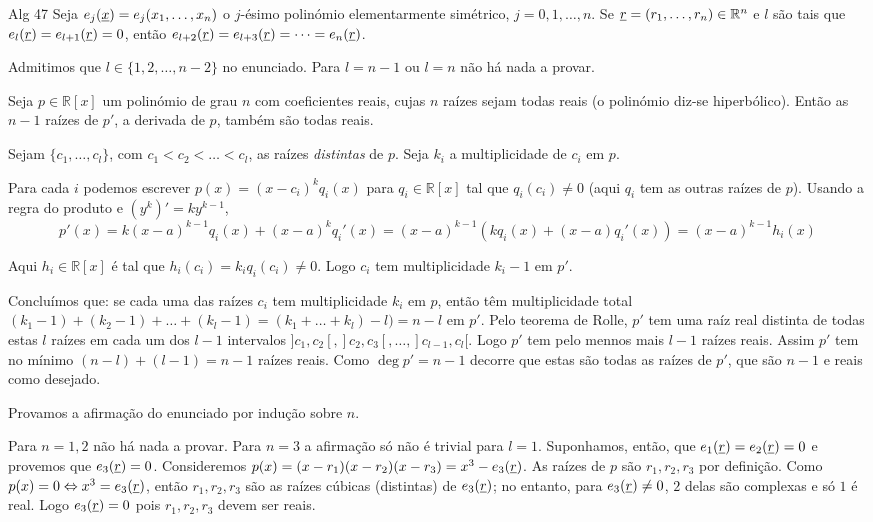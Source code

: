 \documentclass[main.tex]{subfiles}
\renewcommand*{\u}[1]{\ensuremath{\uline{#1}}}
\begin{document}
\begin{problem}{Alg 47}
Seja $e_j(\u{x})=e_j(x_1,\dots,x_n)$ o $j$-ésimo polinómio elementarmente
simétrico, $j=0,1,\dots,n$.
Se $\u{r}=(r_1,\dots,r_n)\in\mathbb{R}^n$ e $l$ são tais que
$e_l(\u{r})=e_{l+1}(\u{r})=0$, então
$e_{l+2}(\u{r})=e_{l+3}(\u{r})=\dots=e_n(\u{r})$.
\end{problem}

\begin{solution}
Admitimos que $l\in\{1,2,\dots,n-2\}$ no enunciado.
Para $l=n-1$ ou $l=n$ não há nada a provar.

\begin{lemma}
Seja $p\in\mathbb{R}[x]$ um polinómio de grau $n$ com coeficientes reais,
cujas $n$ raízes sejam todas reais (o polinómio diz-se hiperbólico).
Então as $n-1$ raízes de $p'$, a derivada de $p$, também são todas reais.

\begin{quickproof}
Sejam $\{c_1,\dots,c_l\}$, com $c_1<c_2<\dots<c_l$,
as raízes \emph{distintas} de $p$.
Seja $k_i$ a multiplicidade de $c_i$ em $p$.

Para cada $i$ podemos escrever $p(x)=(x-c_i)^k q_i(x)$
para $q_i\in\mathbb{R}[x]$ tal que $q_i(c_i)\neq 0$
(aqui $q_i$ tem as outras raízes de $p$).
Usando a regra do produto e $(y^k)'=ky^{k-1}$,
\begin{equation*}
p'(x)=k(x-a)^{k-1} q_i(x)+(x-a)^kq_i'(x)
=(x-a)^{k-1}(kq_i(x)+(x-a)q_i'(x))
=(x-a)^{k-1}h_i(x)
\end{equation*}

Aqui $h_i\in\mathbb{R}[x]$ é tal que $h_i(c_i)=k_iq_i(c_i)\neq 0$.
Logo $c_i$ tem multiplicidade $k_i-1$ em $p'$.

Concluímos que: se cada uma das raízes $c_i$ tem multiplicidade $k_i$ em $p$,
então têm multiplicidade total
$(k_1-1)+(k_2-1)+\dots+(k_l-1)=(k_1+\dots+k_l)-l)=n-l$ em $p'$.
Pelo teorema de Rolle, $p'$ tem uma raíz real distinta de todas estas $l$
raízes em cada um dos $l-1$ intervalos $]c_1,c_2[,]c_2,c_3[,\dots,]c_{l-1},c_l[$.
Logo $p'$ tem pelo mennos mais $l-1$ raízes reais.
Assim $p'$ tem no mínimo $(n-l)+(l-1)=n-1$ raízes reais.
Como $\deg p'=n-1$ decorre que estas são todas as raízes de $p'$,
que são $n-1$ e reais como desejado.
\end{quickproof}
\end{lemma}

Provamos a afirmação do enunciado por indução sobre $n$.

Para $n=1,2$ não há nada a provar.
Para $n=3$ a afirmação só não é trivial para $l=1$.
Suponhamos, então, que $e_1(\u{r})=e_2(\u{r})=0$ e provemos que $e_3(\u{r})=0$.
Consideremos $p(x)=(x-r_1)(x-r_2)(x-r_3)=x^3-e_3(\u{r})$.
As raízes de $p$ são $r_1,r_2,r_3$ por definição.
Como $p(x)=0\Leftrightarrow x^3=e_3(\u{r})$,
então $r_1,r_2,r_3$ são as raízes cúbicas (distintas) de $e_3(\u{r})$;
no entanto, para $e_3(\u{r})\neq 0$, $2$ delas são complexas e só $1$ é real.
Logo $e_3(\u{r})=0$ pois $r_1,r_2,r_3$ devem ser reais.


\end{solution}
\end{document}
